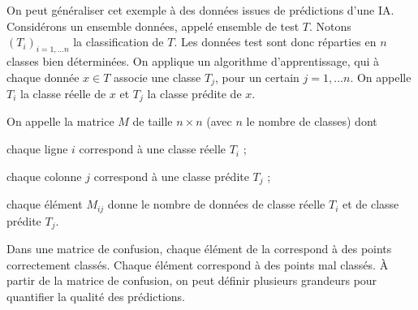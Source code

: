\documentclass[12pt,fancy]{cours}
\begin{document}
On peut généraliser cet exemple à des données issues de prédictions d’une IA. Considérons un ensemble données, appelé ensemble de test $T$. Notons $(T_i)_{i=1,...n}$ la classification de $T$. Les données test sont donc réparties en $n$ classes bien déterminées. On applique un algorithme d’apprentissage, qui à chaque donnée $x\in T$ associe une classe $T_j$, pour un certain $j=1,...n$. On appelle $T_i$ la classe réelle de $x$ et $T_j$ la classe prédite de $x$.
\begin{definition}
On appelle  la matrice $M$ de taille $n\times n$ (avec $n$ le nombre de classes) dont
\begin{liste}
\item chaque ligne $i$ correspond à une classe réelle $T_i$ ;
\item chaque colonne $j$ correspond à une classe prédite $T_j$ ;
\item chaque élément $M_{ij}$ donne le nombre de données de classe réelle $T_i$ et de classe prédite $T_j$.
\end{liste}
\end{definition}
Dans une matrice de confusion, chaque élément de la  correspond à des points correctement classés. Chaque élément  correspond à des points mal classés. À partir de la matrice de confusion, on peut définir plusieurs grandeurs pour quantifier la qualité des prédictions.

\end{document}
